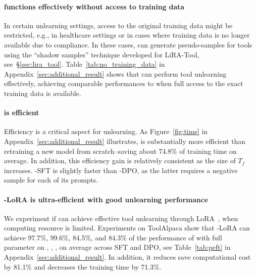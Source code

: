 \paragraph{\method functions effectively without access to training data}\label{sec:no_training_data}
In certain unlearning settings, access to the original training data might be restricted, e.g., in healthcare settings or in cases where training data is no longer available due to compliance. In these cases, \method can generate pseudo-samples for tools using the ``shadow samples'' technique developed for LiRA-Tool, see~\S\ref{sec:lira_tool}. Table~\ref{tab:no_training_data} in Appendix~\ref{sec:additional_result} shows that \method can perform tool unlearning effectively, achieving comparable performances to when full access to the exact training data is available.


\paragraph{\method is efficient}
Efficiency is a critical aspect for unlearning. As Figure~\ref{fig:time} in Appendix~\ref{sec:additional_result} illustrates, \method is substantially more efficient than retraining a new model from scratch--saving about 74.8\% of training time on average. In addition, this efficiency gain is relatively consistent as the size of $T_f$ increases. \method-SFT is slightly faster than \method-DPO, as the latter requires a negative sample for each of its prompts.



\paragraph{\method-LoRA is ultra-efficient with good unlearning performance}
We experiment if \method can achieve effective tool unlearning through LoRA~\citep{hu2022lora}, when computing resource is limited. Experiments on ToolAlpaca show that \method-LoRA can achieve 97.7\%, 99.6\%, 84.5\%, and 84.3\% of the performance of \method with full parameter on \ttest, \tr, \tf, \tg on average across SFT and DPO, see Table~\ref{tab:peft} in Appendix~\ref{sec:additional_result}. In addition, it reduces save computational cost by 81.1\% and decreases the training time by 71.3\%.


